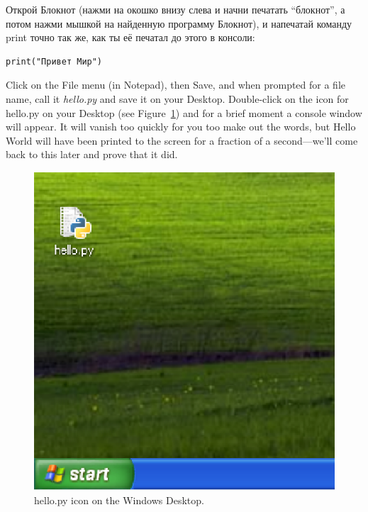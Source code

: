 \begin{WINDOWS}
Открой Блокнот (нажми на окошко внизу слева и начни печатать ``блокнот'', а потом нажми мышкой на найденную программу Блокнот), и напечатай команду print точно так же, как ты её печатал до этого в консоли:

\begin{listing}
\begin{verbatim}
print("Привет Мир")
\end{verbatim}
\end{listing}

Click on the File menu (in Notepad), then Save, and when prompted for a file name, call it \emph{hello.py} and save it on your Desktop. Double-click on the icon for hello.py on your Desktop (see Figure~\ref{fig5}) and for a brief moment a console window will appear.  It will vanish too quickly for you too make out the words, but Hello World will have been printed to the screen for a fraction of a second---we'll come back to this later and prove that it did.\\

\begin{figure}
\begin{center}
\includegraphics{figure5.eps}
\end{center}
\caption{hello.py icon on the Windows Desktop.}\label{fig5}
\end{figure}
\end{WINDOWS}

